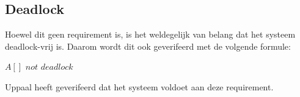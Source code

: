 \documentclass{article} %
\begin{document}
\subsection{Deadlock}
Hoewel dit geen requirement is, is het weldegelijk van belang dat het systeem deadlock-vrij is. Daarom wordt dit ook geverifeerd met de volgende formule:

\begin{boxA}
    $A[]$ $not$ $deadlock$
\end{boxA}

Uppaal heeft geverifeerd dat het systeem voldoet aan deze requirement.

\newpage




\end{document}
